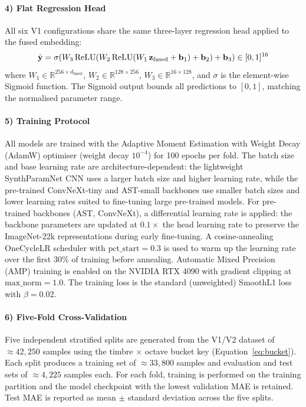 \paragraph{4) Flat Regression Head}
All six V1 configurations share the same three-layer regression head applied to the fused embedding:
\begin{equation}
    \hat{\mathbf{y}} = \sigma\!\left(W_3\, \text{ReLU}\!\left(W_2\, \text{ReLU}\!\left(W_1\, \mathbf{z}_{\text{fused}} + \mathbf{b}_1\right) + \mathbf{b}_2\right) + \mathbf{b}_3\right) \in [0,1]^{16}
    \label{eq:flat_head}\eqname{Flat regression head}
\end{equation}
where $W_1 \in \mathbb{R}^{256 \times d_{\text{fused}}}$, $W_2 \in \mathbb{R}^{128 \times 256}$, $W_3 \in \mathbb{R}^{16 \times 128}$, and $\sigma$ is the element-wise Sigmoid function. The Sigmoid output bounds all predictions to $[0, 1]$, matching the normalised parameter range.

\paragraph{5) Training Protocol}
All models are trained with the Adaptive Moment Estimation with Weight Decay (AdamW) optimiser (weight decay $10^{-4}$) for 100 epochs per fold. The batch size and base learning rate are architecture-dependent: the lightweight SynthParamNet CNN uses a larger batch size and higher learning rate, while the pre-trained ConvNeXt-tiny and AST-small backbones use smaller batch sizes and lower learning rates suited to fine-tuning large pre-trained models. For pre-trained backbones (AST, ConvNeXt), a differential learning rate is applied: the backbone parameters are updated at $0.1\times$ the head learning rate to preserve the ImageNet-22k representations during early fine-tuning. A cosine-annealing OneCycleLR scheduler with $\text{pct\_start}=0.3$ is used to warm up the learning rate over the first 30\% of training before annealing. Automatic Mixed Precision (AMP) training is enabled on the NVIDIA RTX 4090 with gradient clipping at $\text{max\_norm}=1.0$. The training loss is the standard (unweighted) SmoothL1 loss with $\beta=0.02$.

\paragraph{6) Five-Fold Cross-Validation}
Five independent stratified splits are generated from the V1/V2 dataset of $\approx 42{,}250$ samples using the timbre $\times$ octave bucket key (Equation~\ref{eq:bucket}). Each split produces a training set of $\approx 33{,}800$ samples and evaluation and test sets of $\approx 4{,}225$ samples each. For each fold, training is performed on the training partition and the model checkpoint with the lowest validation MAE is retained. Test MAE is reported as mean $\pm$ standard deviation across the five splits.

